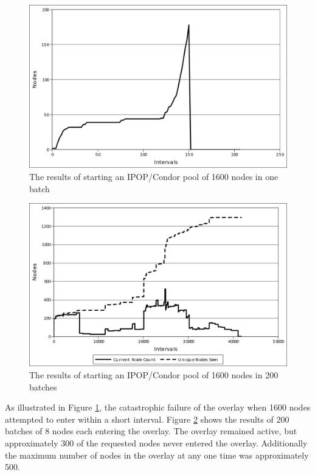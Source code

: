 \begin{figure}
\begin{centering}
\includegraphics[width=1\columnwidth]{figures/1x200fail}
\par\end{centering}
\caption{\label{fig:1600-1batch}The results of starting an IPOP/Condor pool of 1600 nodes in one batch}
\end{figure}


\begin{figure}
\begin{centering}
\includegraphics[width=1\columnwidth]{figures/200x1}
\par\end{centering}
\caption{\label{fig:1600-200batches}The results of starting an IPOP/Condor pool of 1600 nodes in 200
batches}
\end{figure}

As illustrated in Figure \ref{fig:1600-1batch}, the catastrophic
failure of the overlay when 1600 nodes attempted to enter within a
short interval. Figure \ref{fig:1600-200batches} shows the results
of 200 batches of 8 nodes each entering the overlay. The overlay remained
active, but approximately 300 of the requested nodes never entered
the overlay. Additionally the maximum number of nodes in the overlay
at any one time was approximately 500.

